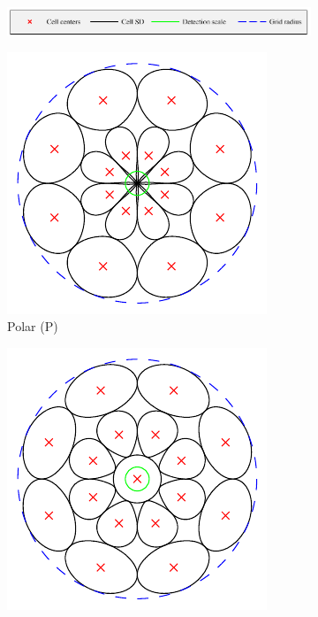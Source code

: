 \documentclass[thesis.tex]{subfiles}
\begin{document}
\begin{figure}[p]
	\centering
	\begin{subfigure}[t]{\textwidth}
		\includegraphics[width=\textwidth]{img/gridType_legend.pdf}
	\end{subfigure}
	\begin{subfigure}[t]{0.32\textwidth}
		\includegraphics[width=\textwidth]{img/gridType_polar_polar_gaussian.pdf}
		\caption{Polar (P)}
		\label{fig:gridTypeP}
	\end{subfigure}
	\begin{subfigure}[t]{0.32\textwidth}
		\includegraphics[width=\textwidth]{img/gridType_polar_central_polar_gaussian.pdf}

\end{subfigure}
\end{figure}
\end{document}
